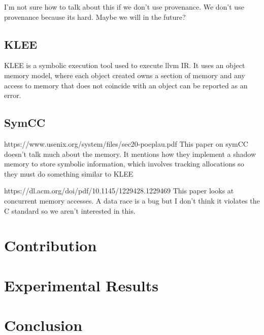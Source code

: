 \documentclass[12pt,twoside]{report}
\begin{document}
I'm not sure how to talk about this if we don't use provenance. We don't use provenance because its hard. Maybe we will in the future?

\section{KLEE}
KLEE is a symbolic execution tool used to execute llvm IR. It uses an object memory model, where each object created owns a section of memory and any access to memory that does not coincide with an object can be reported as an error.

\section{SymCC}
https://www.usenix.org/system/files/sec20-poeplau.pdf This paper on symCC doesn't talk much about the memory. It mentions how they implement a shadow memory to store symbolic information, which involves tracking allocations so they must do something similar to KLEE


https://dl.acm.org/doi/pdf/10.1145/1229428.1229469 This paper looks at concurrent memory accesses. A data race is a bug but I don't think it violates the C standard so we aren't interested in this.



\chapter{Contribution}


\chapter{Experimental Results}


\chapter{Conclusion}



\end{document}
